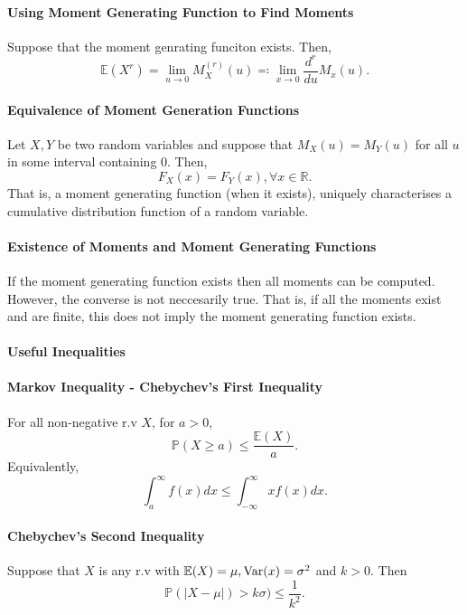 \paragraph{Using Moment Generating Function to Find Moments}
Suppose that the moment genrating funciton exists. Then,
\[
    \mathbb{E}(X^r)
    = \lim_{u\to 0} M_X^(r)(u)
    \eqqcolon \lim_{x\to 0} \frac{d^r}{d u} M_x(u) .
\]

\paragraph{Equivalence of Moment Generation Functions}
Let \(X, Y\) be two random variables and 
suppose that \(M_X(u) = M_Y(u)\) for all \(u\) in some interval
containing \(0\). Then, \[
    F_X(x) = F_Y(x), \forall x \in \mathbb{R}.
\]
That is, a moment generating function (when it exists), uniquely
characterises a cumulative distribution function of a random variable.

\paragraph{Existence of Moments and Moment Generating Functions}
If the moment generating function exists then all moments can be computed.
However, the converse is not neccesarily true.
That is, if all the moments exist and are finite, this does not imply
the moment generating function exists.

\paragraph{Useful Inequalities}

\paragraph{Markov Inequality - Chebychev's First Inequality}
For all non-negative r.v \(X\), for \(a > 0\),
\[
    \mathbb{P}(X \geq a) \leq \frac{\mathbb{E}(X)}{a}.
\]
Equivalently, \[
    \int_{a}^{\infty} f(x) dx \leq \int_{-\infty}^{\infty} x f(x) dx.
\]

\paragraph{Chebychev's Second Inequality}
Suppose that \(X\) is any r.v with \(\mathbb{E}(X) = \mu, \mathrm{Var}(x) = \sigma^2\)
and \(k > 0\). Then \[
    \mathbb{P}(|X - \mu|) > k \sigma) \leq \frac{1}{k^2}.
\]

